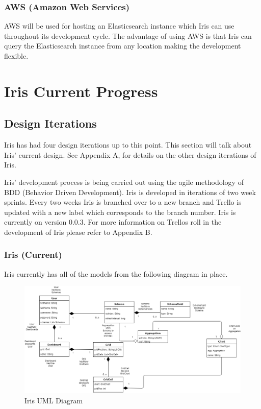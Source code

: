\documentclass[12pt,a4paper,titlepage]{report}
\begin{document}
\subsection{AWS (Amazon Web Services)}

AWS will be used for hosting an Elasticsearch instance which Iris can use throughout its development cycle. The advantage of using AWS is that Iris can query the Elasticsearch instance from any location making the development flexible.

\chapter{Iris Current Progress}

\section{ Design Iterations}

Iris has had four design iterations up to this point. This section will talk about Iris’ current design. See Appendix A, for details on the other design iterations of Iris. 

Iris’ development process is being carried out using the agile methodology of BDD (Behavior Driven Development). Iris is developed in iterations of two week sprints. Every two weeks Iris is branched over to a new branch and Trello is updated with a new label which corresponds to the branch number. Iris is currently on version 0.0.3. For more information on Trellos roll in the development of Iris please refer to Appendix B.

\subsection{Iris (Current)}

Iris currently has all of the models from the following diagram in place.
\begin{figure}[H]
\begin{tcolorbox}
\includegraphics[width=\textwidth,height=\textheight,keepaspectratio]{iris_models}
\end{tcolorbox}
\caption{Iris UML Diagram}
\end{figure}
\end{document}
